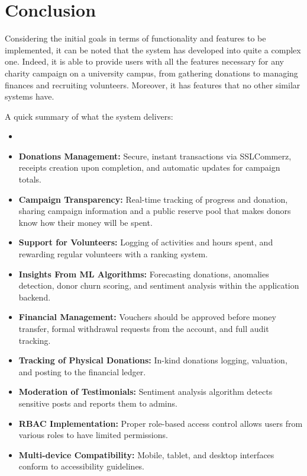 \documentclass{thesis-library}
\begin{document}
\section{Conclusion}

Considering the initial goals in terms of functionality and features to be implemented, it can be noted that the system has developed into quite a complex one. Indeed, it is able to provide users with all the features necessary for any charity campaign on a university campus, from gathering donations to managing finances and recruiting volunteers. Moreover, it has features that no other similar systems have.

A quick summary of what the system delivers:
\begin{itemize}
    \item \item \textbf{Donations Management:} Secure, instant transactions via SSLCommerz, receipts creation upon completion, and automatic updates for campaign totals.
    \item \textbf{Campaign Transparency:} Real-time tracking of progress and donation, sharing campaign information and a public reserve pool that makes donors know how their money will be spent.
    \item \textbf{Support for Volunteers:} Logging of activities and hours spent, and rewarding regular volunteers with a ranking system.
    \item \textbf{Insights From ML Algorithms:} Forecasting donations, anomalies detection, donor churn scoring, and sentiment analysis within the application backend.
    \item \textbf{Financial Management:} Vouchers should be approved before money transfer, formal withdrawal requests from the account, and full audit tracking.
    \item \textbf{Tracking of Physical Donations:} In-kind donations logging, valuation, and posting to the financial ledger.
    \item \textbf{Moderation of Testimonials:} Sentiment analysis algorithm detects sensitive posts and reports them to admins.
    \item \textbf{RBAC Implementation:} Proper role-based access control allows users from various roles to have limited permissions.
    \item \textbf{Multi-device Compatibility:} Mobile, tablet, and desktop interfaces conform to accessibility guidelines.
\end{itemize}
\end{document}
